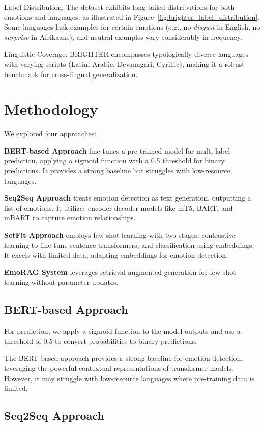 \documentclass[a4paper,12pt]{extarticle}
\begin{document}
Label Distribution: 
The dataset exhibits long-tailed distributions for both emotions and languages, 
as illustrated in Figure~\ref{fig:brighter_label_distribution}. 
Some languages lack examples for certain emotions (e.g., no \textit{disgust} in English, no \textit{surprise} in Afrikaans), and neutral examples vary considerably in frequency.

Linguistic Coverage: BRIGHTER encompasses typologically diverse languages with varying scripts (Latin, Arabic, Devanagari, Cyrillic), making it a robust benchmark for cross-lingual generalization.

\section{Methodology}

We explored four approaches: 

\textbf{BERT-based Approach} fine-tunes a pre-trained model for multi-label prediction, applying a sigmoid function with a 0.5 threshold for binary predictions. It provides a strong baseline but struggles with low-resource languages.

\textbf{Seq2Seq Approach} treats emotion detection as text generation, outputting a list of emotions. It utilizes encoder-decoder models like mT5, BART, and mBART to capture emotion relationships.

\textbf{SetFit Approach} employs few-shot learning with two stages: contrastive learning to fine-tune sentence transformers, and classification using embeddings. It excels with limited data, adapting embeddings for emotion detection.

\textbf{EmoRAG System} leverages retrieval-augmented generation for few-shot learning without parameter updates.
\subsection{BERT-based Approach}

For prediction, we apply a sigmoid function to the model outputs and use a threshold of 0.5 to convert probabilities to binary predictions:

The BERT-based approach provides a strong baseline for emotion detection, leveraging the powerful contextual representations of transformer models. However, it may struggle with low-resource languages where pre-training data is limited.

\subsection{Seq2Seq Approach}
\end{document}
